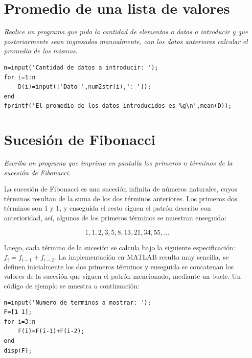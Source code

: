 \section{Promedio de una lista de valores}

\textit{Realice un programa que pida la cantidad de elementos o datos a introducir y que posteriormente sean ingresados manualmente, con los datos anteriores calcular el promedio de los mismos.}



\begin{verbatim}
n=input('Cantidad de datos a introducir: ');
for i=1:n
    D(i)=input(['Dato ',num2str(i),': ']);
end
fprintf('El promedio de los datos introducidos es %g\n',mean(D));
\end{verbatim}


\section{Sucesión de Fibonacci}

\textit{Escriba un programa que imprima en pantalla los primeros n términos de la sucesión de Fibonacci.}



La sucesión de Fibonacci es una sucesión infinita de números naturales, cuyos términos resultan de la 
suma de los dos términos anteriores. Los primeros dos términos son 1 y 1, y enseguida el resto siguen 
el patrón descrito con anterioridad, así, algunos de los primeros términos se muestran enseguida:

$$ 1,1,2,3,5,8,13,21,34,55,... $$

Luego, cada término de la sucesión se calcula bajo la siguiente especificación: $f_i=f_{i-1}+f_{i-2}$. 
La implementación en MATLAB resulta muy sencilla, se definen inicialmente los dos primeros términos y 
enseguida se concatenan los valores de la sucesión que siguen el patrón mencionado, mediante un bucle. 
Un código de ejemplo se muestra a continuación:

\begin{verbatim}
n=input('Numero de terminos a mostrar: ');
F=[1 1];
for i=3:n
    F(i)=F(i-1)+F(i-2);
end
disp(F);
\end{verbatim}



